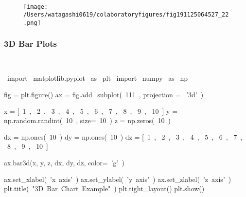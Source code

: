 \begin{paracol}{2}
\begin{cellExecute}[escapechar=~]
~~
\end{cellExecute}
\switchcolumn
\begin{resultCell}[escapechar=~]
\end{resultCell}
\end{paracol}

\begin{figure}[H]
\centering
\texttt{[image: /Users/watagashi0619/colaboratoryfigures/fig191125064527\_22.png]}
\end{figure}
\subsubsection{3D Bar Plots}

\begin{paracol}{2}
\smallskip
\begin{cellExecute}[escapechar=~]
~~
\end{cellExecute}
\switchcolumn
\begin{codeCell}[escapechar=~]
~\textcolor{mtk17}{import}~ matplotlib.pyplot ~\textcolor{mtk17}{as}~ plt
~\textcolor{mtk17}{import}~ numpy ~\textcolor{mtk17}{as}~ np

fig = plt.figure()
ax = fig.add_subplot(~\textcolor{mtk7}{111}~, projection = ~\textcolor{mtk25}{'3d'}~)

x = [~\textcolor{mtk7}{1}~, ~\textcolor{mtk7}{2}~, ~\textcolor{mtk7}{3}~, ~\textcolor{mtk7}{4}~, ~\textcolor{mtk7}{5}~, ~\textcolor{mtk7}{6}~, ~\textcolor{mtk7}{7}~, ~\textcolor{mtk7}{8}~, ~\textcolor{mtk7}{9}~, ~\textcolor{mtk7}{10}~]
y = np.random.randint(~\textcolor{mtk7}{10}~, size=~\textcolor{mtk7}{10}~)
z = np.zeros(~\textcolor{mtk7}{10}~)

dx = np.ones(~\textcolor{mtk7}{10}~)
dy = np.ones(~\textcolor{mtk7}{10}~)
dz = [~\textcolor{mtk7}{1}~, ~\textcolor{mtk7}{2}~, ~\textcolor{mtk7}{3}~, ~\textcolor{mtk7}{4}~, ~\textcolor{mtk7}{5}~, ~\textcolor{mtk7}{6}~, ~\textcolor{mtk7}{7}~, ~\textcolor{mtk7}{8}~, ~\textcolor{mtk7}{9}~, ~\textcolor{mtk7}{10}~]

ax.bar3d(x, y, z, dx, dy, dz, color=~\textcolor{mtk25}{'g'}~)

ax.set_xlabel(~\textcolor{mtk25}{'x axis'}~)
ax.set_ylabel(~\textcolor{mtk25}{'y axis'}~)
ax.set_zlabel(~\textcolor{mtk25}{'z axis'}~)
plt.title(~\textcolor{mtk25}{"3D Bar Chart Example"}~)
plt.tight_layout()
plt.show()
\end{codeCell}
\end{paracol}

